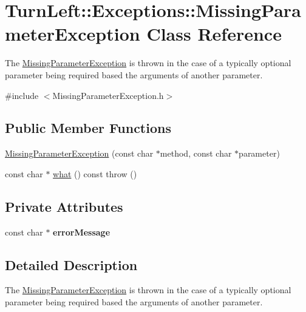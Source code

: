\hypertarget{classTurnLeft_1_1Exceptions_1_1MissingParameterException}{
\section{TurnLeft::Exceptions::MissingParameterException Class Reference}
\label{classTurnLeft_1_1Exceptions_1_1MissingParameterException}
}


The \hyperlink{classTurnLeft_1_1Exceptions_1_1MissingParameterException}{MissingParameterException} is thrown in the case of a typically optional parameter being required based the arguments of another parameter.  




{\ttfamily \#include $<$MissingParameterException.h$>$}

\subsection*{Public Member Functions}
\begin{DoxyCompactItemize}
\item 
\hyperlink{classTurnLeft_1_1Exceptions_1_1MissingParameterException_a5db66bc95c60f9eb83e71197efdf10a7}{MissingParameterException} (const char $\ast$method, const char $\ast$parameter)
\item 
const char $\ast$ \hyperlink{classTurnLeft_1_1Exceptions_1_1MissingParameterException_a475acbb9e8b2365546c3d93468327c51}{what} () const   throw ()
\end{DoxyCompactItemize}
\subsection*{Private Attributes}
\begin{DoxyCompactItemize}
\item 
\hypertarget{classTurnLeft_1_1Exceptions_1_1MissingParameterException_ab5eff7906e125988f90dc5fc03dd4756}{
const char $\ast$ {\bfseries errorMessage}}
\label{classTurnLeft_1_1Exceptions_1_1MissingParameterException_ab5eff7906e125988f90dc5fc03dd4756}

\end{DoxyCompactItemize}


\subsection{Detailed Description}
The \hyperlink{classTurnLeft_1_1Exceptions_1_1MissingParameterException}{MissingParameterException} is thrown in the case of a typically optional parameter being required based the arguments of another parameter. 

